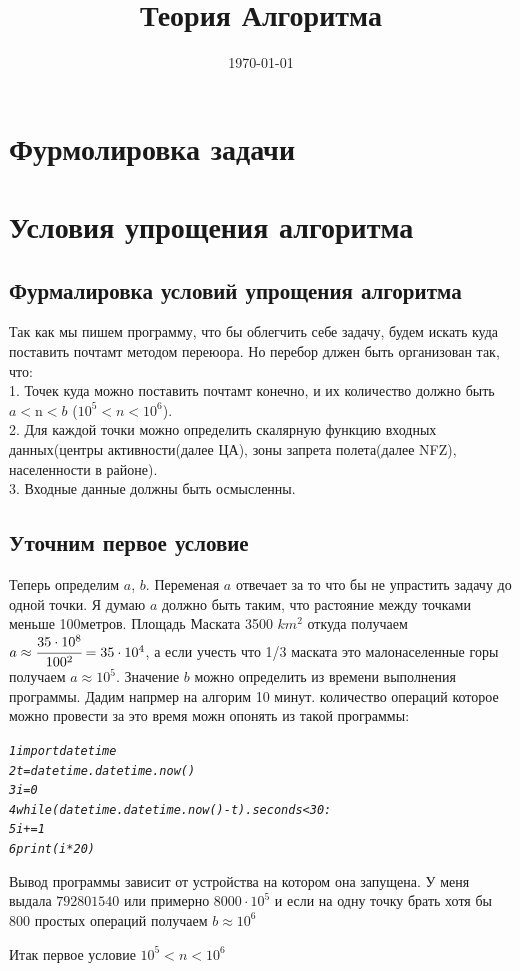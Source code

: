 \documentclass[12pt]{article} %
\title{Теория Алгоритма} %
\date{\today} %
\begin{document}
 	\tableofcontents
 	\newpage
 	\section{Фурмолировка задачи}
 	
 	\section{Условия упрощения алгоритма}
 	\subsection{Фурмалировка условий упрощения алгоритма}
 	\hspace*{1cm}Так как мы пишем программу, что бы облегчить себе задачу, будем искать куда поставить почтамт методом переюора. Но перебор длжен быть организован так, что:\\
 	\hspace*{5mm}1. Точек куда можно поставить почтамт конечно, и их количество должно быть \(a<\text{n}<b\) ($10^5<n<10^6$).\\
 	\hspace*{5mm}2. Для каждой точки можно определить скалярную функцию входных данных(центры активности(далее ЦА), зоны запрета полета(далее NFZ), населенности в районе).\\
 	\hspace*{5mm}3. Входные данные должны быть осмысленны.
 	\subsection{Уточним первое условие}
 	\hspace*{10mm}Теперь определим \(a\), \(b\). Переменая $a$ отвечает за то что бы не упрастить задачу до одной точки. Я думаю $a$ должно быть таким, что растояние между точками меньше 100метров. Площадь Маската 3500 $km^2$ откуда получаем $a\approx \cfrac{35\cdot 10^8}{100^2} =35 \cdot 10^4   $, а если учесть что 1/3 маската это малонаселенные горы получаем $a \approx 10^5$. Значение $b$ можно определить из времени выполнения программы. Дадим напрмер на алгорим 10 минут. количество операций которое можно провести за это время можн опонять из такой программы:\\
 	\begin{alltt}
 		\textit{1 import datetime
 		2 t = datetime.datetime.now()
 		3 i = 0
 		4 while (datetime.datetime.now() - t).seconds < 30:
 		5     i += 1
 		6 print(i * 20)}
 	\end{alltt}
 	Вывод программы зависит от устройства на котором она запущена. У меня выдала $792801540$ или  примерно $8000 \cdot 10^5$ и если на одну точку брать хотя бы 800 простых операций получаем $b \approx10^6$ \par
 	Итак первое условие $10^5<n<10^6$
\end{document}
